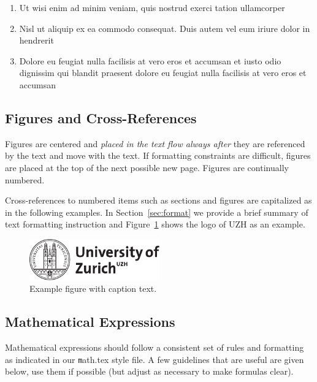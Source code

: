 \documentclass[11pt, a4paper,oneside,chapterprefix=false]{scrbook}
\begin{document}
\begin{enumerate}
\item Ut wisi enim ad minim veniam, quis nostrud exerci tation ullamcorper 
\item Nisl ut aliquip ex ea commodo consequat. Duis autem vel eum iriure dolor in hendrerit
\item Dolore eu feugiat nulla facilisis at vero eros et accumsan et iusto odio dignissim qui blandit praesent dolore eu feugiat nulla facilisis at vero eros et accumsan
\end{enumerate}

\subsection{Figures and Cross-References}

Figures are centered and {\em placed in the text flow always after} they are referenced by the text and move with the text. If formatting constraints are difficult, figures are placed at the top of the next possible new page. Figures are continually numbered.

Cross-references to numbered items such as sections and figures are capitalized as in the following examples. In Section~\ref{sec:format} we provide a brief summary of text formatting instruction and Figure~\ref{fig:vmml} shows the logo of UZH as an example. 

\begin{figure}[htp]
 \centering
 \includegraphics[width=0.5\textwidth]{figures/uzh_logo}
 \caption{Example figure with caption text.}
 \label{fig:vmml}
\end{figure}



\subsection{Mathematical Expressions}

Mathematical expressions should follow a consistent set of rules and formatting as indicated in our {\texttt math.tex} style file. A few guidelines that are useful are given below, use them if possible (but adjust as necessary to make formulas clear).
\end{document}
